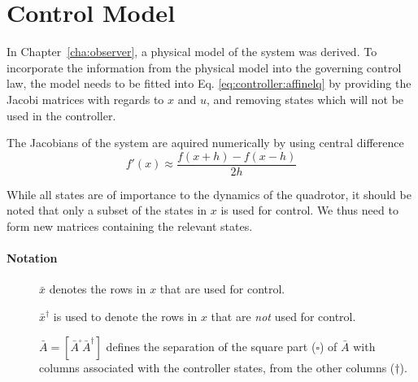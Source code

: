 \section{Control Model}
\label{sec:controller:model}
    In Chapter~\ref{cha:observer}, a physical model of the system
    was derived. To incorporate the information from the physical model
    into the governing control law, the model needs to be fitted into Eq.
    \eqref{eq:controller:affinelq} by providing the Jacobi matrices with
    regards to $x$ and $u$, and removing states which will not be
    used in the controller.

    The Jacobians of the system are aquired numerically by using
    central difference
    \begin{equation}
        f'(x) \approx \frac{f(x+h) - f(x-h)}{2h}
    \end{equation}

    While all states are of importance to the dynamics of the quadrotor,
    it should be noted that only a subset of the states in $x$ is used for control.
    We thus need to form new matrices containing the relevant states.
    \paragraph{Notation}
    \begin{description}
        \item[] $\bar{x}$ denotes the rows in $x$ that are used for control.
        \item[] $\bar{x}^{\dagger}$ is used to denote the rows in $x$ that are \textit{not} used for control.
        \item[] $\bar{A} = [ \bar{A}^{\square} \bar{A}^{\dagger}]$
        defines the separation of the square part ($\square$) of $\bar{A}$ with columns
        associated with the controller states, from the other columns ($\dagger$).
    \end{description}

